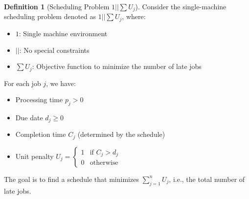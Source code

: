 \documentclass{article}
\theoremstyle{definition}
\newtheorem{definition}{Definition}
\begin{document}
\begin{definition}[Scheduling Problem $1||\sum U_j$]
Consider the single-machine scheduling problem denoted as $1||\sum U_j$, where:
\begin{itemize}
    \item $1$: Single machine environment
    \item $||$: No special constraints
    \item $\sum U_j$: Objective function to minimize the number of late jobs
\end{itemize}

For each job $j$, we have:
\begin{itemize}
    \item Processing time $p_j > 0$
    \item Due date $d_j \geq 0$
    \item Completion time $C_j$ (determined by the schedule)
    \item Unit penalty $U_j = 
    \begin{cases} 
        1 & \text{if } C_j > d_j \\ 
        0 & \text{otherwise} 
    \end{cases}$
\end{itemize}

The goal is to find a schedule that minimizes $\sum_{j=1}^{n} U_j$, i.e., the total number of late jobs.
\end{definition}
\end{document}
